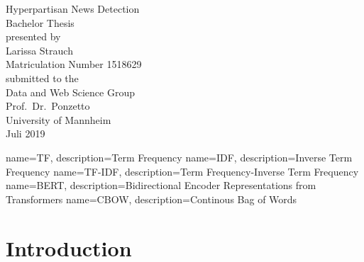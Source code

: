 \documentclass[a4paper, 11pt,titlepage,oneside,openany]{book}
\begin{document}
\begin{titlepage}
	\vspace*{2cm}
  \begin{center}
   {\Large Hyperpartisan News Detection\\}
   \vspace{2cm} 
   {Bachelor Thesis\\}
   \vspace{2cm}
   {presented by\\
    Larissa Strauch \\
    Matriculation Number 1518629\\
   }
   \vspace{1cm} 
   {submitted to the\\
    Data and Web Science Group\\
    Prof.\ Dr.\ Ponzetto\\
    University of Mannheim\\} \vspace{2cm}
   {Juli 2019}
  \end{center}
\end{titlepage} 

\tableofcontents
\newpage

\listofalgorithms
\listofcodes

\listoffigures

\listoftables

{
	name=TF,
	description={Term Frequency}
}
{
	name=IDF,
	description={Inverse Term Frequency}
}
{
	name=TF-IDF,
	description={Term Frequency-Inverse Term Frequency}
}
{
	name=BERT,
	description={Bidirectional Encoder Representations from Transformers}
}
{
	name=CBOW,
	description={Continous Bag of Words}
}


\printglossaries %


\newpage



\chapter{Introduction}
\end{document}
